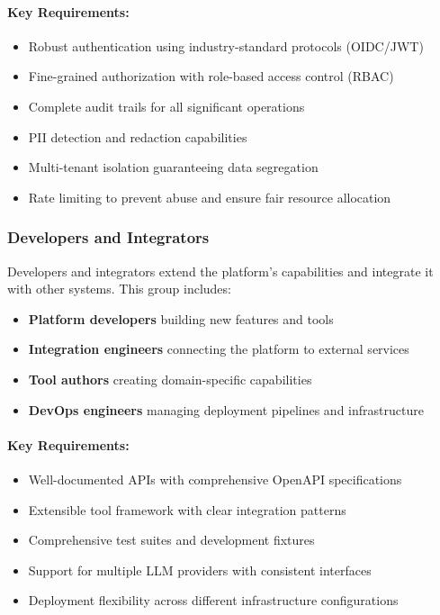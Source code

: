 \paragraph{Key Requirements:}
\begin{itemize}
    \item Robust authentication using industry-standard protocols (OIDC/JWT)
    \item Fine-grained authorization with role-based access control (RBAC)
    \item Complete audit trails for all significant operations
    \item PII detection and redaction capabilities
    \item Multi-tenant isolation guaranteeing data segregation
    \item Rate limiting to prevent abuse and ensure fair resource allocation
\end{itemize}

\subsubsection{Developers and Integrators}

Developers and integrators extend the platform's capabilities and integrate it with other systems. This group includes:

\begin{itemize}
    \item \textbf{Platform developers} building new features and tools
    \item \textbf{Integration engineers} connecting the platform to external services
    \item \textbf{Tool authors} creating domain-specific capabilities
    \item \textbf{DevOps engineers} managing deployment pipelines and infrastructure
\end{itemize}

\paragraph{Key Requirements:}
\begin{itemize}
    \item Well-documented APIs with comprehensive OpenAPI specifications
    \item Extensible tool framework with clear integration patterns
    \item Comprehensive test suites and development fixtures
    \item Support for multiple LLM providers with consistent interfaces
    \item Deployment flexibility across different infrastructure configurations
\end{itemize}

